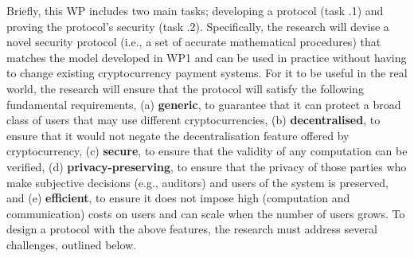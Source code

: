 \noindent{}

\vs

Briefly, this WP includes two main tasks; developing a protocol (task \2.1) and proving the protocol's security (task \2.2). Specifically, the research will devise a novel security protocol (i.e., a set of accurate mathematical procedures) that matches the model developed in WP1 and can be used in practice without having to change existing cryptocurrency payment systems. For it to be useful in the real world, the research will ensure that the protocol will satisfy the following fundamental requirements, (a) \textbf{generic}, to guarantee that it can protect a broad class of users that may use different cryptocurrencies, (b) \textbf{decentralised}, to ensure that it would not negate the decentralisation feature offered by cryptocurrency, 
%
(c) \textbf{secure}, to ensure that the validity of any computation can be verified,  
%
(d) \textbf{privacy-preserving}, to ensure that the privacy of those parties who make subjective decisions (e.g., auditors) and users of the system is preserved, and 
%
(e) \textbf{efficient},  to ensure it does not impose high (computation and communication) costs on users and can scale when the number of users grows.  
To design a protocol with the above features, the research must address several challenges, outlined below. 

